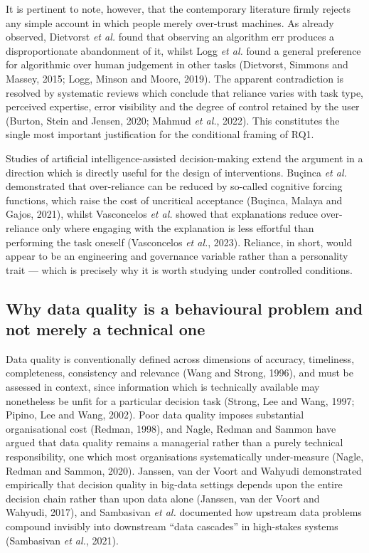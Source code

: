 \documentclass[11pt,a4paper]{article}
\numberwithin{figure}{section}
\numberwithin{table}{section}
\newcommand{\ct}[1]{\textcolor{citeblue}{#1}}          %
\begin{document}
It is pertinent to note, however, that the contemporary literature firmly rejects any simple
account in which people merely over-trust machines. As already observed, Dietvorst \emph{et al.}
found that observing an algorithm err produces a disproportionate abandonment of it, whilst Logg
\emph{et al.} found a general preference for algorithmic over human judgement in other tasks
\ct{(Dietvorst, Simmons and Massey, 2015; Logg, Minson and Moore, 2019)}. The apparent
contradiction is resolved by systematic reviews which conclude that reliance varies with task
type, perceived expertise, error visibility and the degree of control retained by the user
\ct{(Burton, Stein and Jensen, 2020; Mahmud \emph{et al.}, 2022)}. This constitutes the single most
important justification for the conditional framing of RQ1.

Studies of artificial intelligence-assisted decision-making extend the argument in a direction
which is directly useful for the design of interventions. Buçinca \emph{et al.} demonstrated that
over-reliance can be reduced by so-called cognitive forcing functions, which raise the cost of
uncritical acceptance \ct{(Buçinca, Malaya and Gajos, 2021)}, whilst Vasconcelos \emph{et al.}
showed that explanations reduce over-reliance only where engaging with the explanation is less
effortful than performing the task oneself \ct{(Vasconcelos \emph{et al.}, 2023)}. Reliance,
in short, would appear to be an engineering and governance variable rather than a personality
trait --- which is precisely why it is worth studying under controlled conditions.

\subsection{Why data quality is a behavioural problem and not merely a technical one}

Data quality is conventionally defined across dimensions of accuracy, timeliness, completeness,
consistency and relevance \ct{(Wang and Strong, 1996)}, and must be assessed in context, since
information which is technically available may nonetheless be unfit for a particular decision task
\ct{(Strong, Lee and Wang, 1997; Pipino, Lee and Wang, 2002)}. Poor data quality imposes
substantial organisational cost \ct{(Redman, 1998)}, and Nagle, Redman and Sammon have argued that
data quality remains a managerial rather than a purely technical responsibility, one which most
organisations systematically under-measure \ct{(Nagle, Redman and Sammon, 2020)}. Janssen, van der
Voort and Wahyudi demonstrated empirically that decision quality in big-data settings depends upon
the entire decision chain rather than upon data alone \ct{(Janssen, van der Voort and Wahyudi,
2017)}, and Sambasivan \emph{et al.} documented how upstream data problems compound invisibly into
downstream ``data cascades'' in high-stakes systems \ct{(Sambasivan \emph{et al.}, 2021)}.
\end{document}
